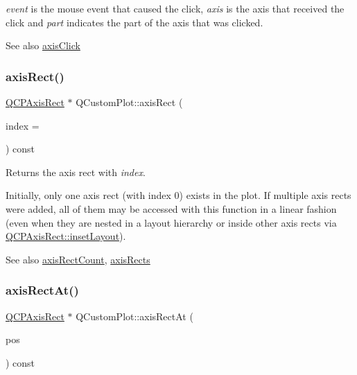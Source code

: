 {\itshape event} is the mouse event that caused the click, {\itshape axis} is the axis that received the click and {\itshape part} indicates the part of the axis that was clicked.

\begin{DoxySeeAlso}{See also}
\mbox{\hyperlink{class_q_custom_plot_abf635f8b56ab5c16d5de9f358543e82b}{axis\+Click}} 
\end{DoxySeeAlso}
\mbox{\label{class_q_custom_plot_ae5eefcb5f6ca26689b1fd4f6e25b42f9}} 
\subsubsection{\texorpdfstring{axisRect()}{axisRect()}}
{\footnotesize\ttfamily \mbox{\hyperlink{class_q_c_p_axis_rect}{Q\+C\+P\+Axis\+Rect}} $\ast$ Q\+Custom\+Plot\+::axis\+Rect (\begin{DoxyParamCaption}\item[{int}]{index = {} }\end{DoxyParamCaption}) const}

Returns the axis rect with {\itshape index}.

Initially, only one axis rect (with index 0) exists in the plot. If multiple axis rects were added, all of them may be accessed with this function in a linear fashion (even when they are nested in a layout hierarchy or inside other axis rects via \mbox{\hyperlink{class_q_c_p_axis_rect_a949f803466619924c7018df4b511ae10}{Q\+C\+P\+Axis\+Rect\+::inset\+Layout}}).

\begin{DoxySeeAlso}{See also}
\mbox{\hyperlink{class_q_custom_plot_a8f85940aaac50efb466287d9d2d04ec6}{axis\+Rect\+Count}}, \mbox{\hyperlink{class_q_custom_plot_a12af771429e2d7e313c8c5d5fca068fe}{axis\+Rects}} 
\end{DoxySeeAlso}
\mbox{\label{class_q_custom_plot_a4a08842fc3e9ba6bed83aa410c5c5ba5}} 
\subsubsection{\texorpdfstring{axisRectAt()}{axisRectAt()}}
{\footnotesize\ttfamily \mbox{\hyperlink{class_q_c_p_axis_rect}{Q\+C\+P\+Axis\+Rect}} $\ast$ Q\+Custom\+Plot\+::axis\+Rect\+At (\begin{DoxyParamCaption}\item[{const Q\+PointF \&}]{pos }\end{DoxyParamCaption}) const}

